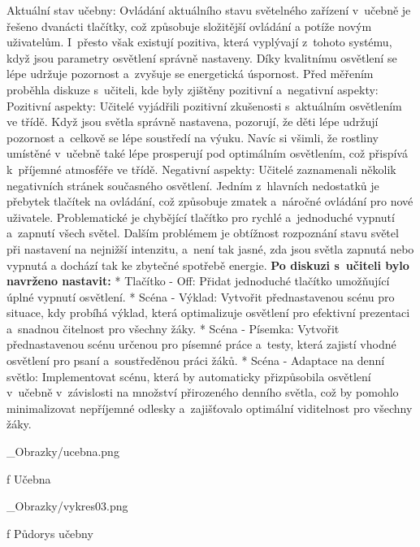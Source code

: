 \sec Aktuální stav učebny:
\medskip
Ovládání aktuálního stavu světelného zařízení v~učebně je řešeno dvanácti tlačítky, což způsobuje složitější ovládání
a potíže novým uživatelům. I~přesto však existují pozitiva, která vyplývají z~tohoto systému, když jsou parametry
osvětlení správně nastaveny. Díky kvalitnímu osvětlení se lépe udržuje pozornost a~zvyšuje se energetická úspornost.
\medskip
Před měřením proběhla diskuze s~učiteli, kde byly zjištěny pozitivní a~negativní aspekty:
\medskip
{\sbf Pozitivní aspekty:}
Učitelé vyjádřili pozitivní zkušenosti s~aktuálním osvětlením ve třídě. Když jsou světla správně nastavena,
pozorují, že děti lépe udržují pozornost a~celkově se lépe soustředí na výuku. Navíc si všimli, že rostliny
umístěné v~učebně také lépe prosperují pod optimálním osvětlením, což přispívá k~příjemné atmosféře ve třídě.
\medskip
{\sbf Negativní aspekty:}
Učitelé zaznamenali několik negativních stránek současného osvětlení. Jedním z~hlavních nedostatků je přebytek
tlačítek na ovládání, což způsobuje zmatek a~náročné ovládání pro nové uživatele. Problematické je chybějící
tlačítko pro rychlé a~jednoduché vypnutí a~zapnutí všech světel. Dalším problémem je obtížnost rozpoznání
stavu světel při nastavení na nejnižší intenzitu, a~není tak jasné, zda jsou světla zapnutá nebo vypnutá
a dochází tak ke zbytečné spotřebě energie.
\medskip
{\bf Po diskuzi s~učiteli bylo navrženo nastavit:}
\medskip
\begitems
    * {\sbf Tlačítko - Off:} Přidat jednoduché tlačítko umožňující úplné vypnutí osvětlení.
\medskip
    * {\sbf Scéna - Výklad:} Vytvořit přednastavenou scénu pro situace, kdy probíhá výklad, která optimalizuje
    osvětlení pro efektivní prezentaci a~snadnou čitelnost pro všechny žáky.
\medskip
    * {\sbf Scéna - Písemka:} Vytvořit přednastavenou scénu určenou pro písemné práce a~testy, která
    zajistí vhodné osvětlení pro psaní a~soustředěnou práci žáků.
\medskip
    * {\sbf Scéna - Adaptace na denní světlo:} Implementovat scénu, která by automaticky přizpůsobila
    osvětlení v~učebně v~závislosti na množství přirozeného denního světla, což by pomohlo minimalizovat
    nepříjemné odlesky a~zajišťovalo optimální viditelnost pro všechny žáky.
\enditems

\medskip {}
\picw=15cm _Obrazky/ucebna.png
\caption/f Učebna
\medskip


\medskip {}
\picw=15cm _Obrazky/vykres03.png
\caption/f Půdorys učebny
\medskip






